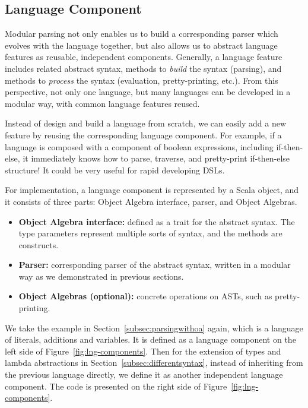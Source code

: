 

\subsection{Language Component}\label{subsec:language-component}

Modular parsing not only enables us to build a corresponding parser which evolves with the language together, but also allows us to abstract language features as reusable, independent components. Generally, a language feature includes related abstract syntax, methods to \textit{build} the syntax (parsing), and methods to \textit{process} the syntax (evaluation, pretty-printing, etc.). From this perspective, not only one language, but many languages can be developed in a modular way, with common language features reused.

Instead of design and build a language from scratch, we can easily add a new feature by reusing the corresponding language component. For example, if a language is composed with a component of boolean expressions, including if-then-else, it immediately knows how to parse, traverse, and pretty-print if-then-else structure! It could be very useful for rapid developing DSLs.

For implementation, a language component is represented by a Scala object, and it consists of three parts: Object Algebra interface, parser, and Object Algebras.

\begin{itemize}
    \item \textbf{Object Algebra interface:} defined as a trait for the abstract syntax. The type parameters represent multiple sorts of syntax, and the methods are constructs.
    \item \textbf{Parser:} corresponding parser of the abstract syntax, written in a modular way as we demonstrated in previous sections.
    \item \textbf{Object Algebras (optional):} concrete operations on ASTs, such as pretty-printing.
\end{itemize}

We take the example in Section~\ref{subsec:parsingwithoa} again, which is a language of literals, additions and variables. It is defined as a
language component on the left side of Figure~\ref{fig:lng-components}.
Then for the extension of types and lambda abstractions in Section~\ref{subsec:differentsyntax}, instead of inheriting from the previous language directly, we define it as another independent language component. The code is presented on the right side of Figure~\ref{fig:lng-components}.

